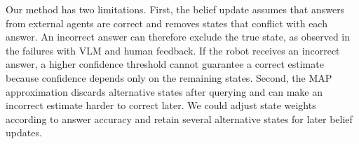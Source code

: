 Our method has two limitations. First, the belief update assumes that answers from external agents are correct and removes states that conflict with each answer. An incorrect answer can therefore exclude the true state, as observed in the failures with VLM and human feedback. If the robot receives an incorrect answer, a higher confidence threshold cannot guarantee a correct estimate because confidence depends only on the remaining states. Second, the MAP approximation discards alternative states after querying and can make an incorrect estimate harder to correct later. We could adjust state weights according to answer accuracy and retain several alternative states for later belief updates.

